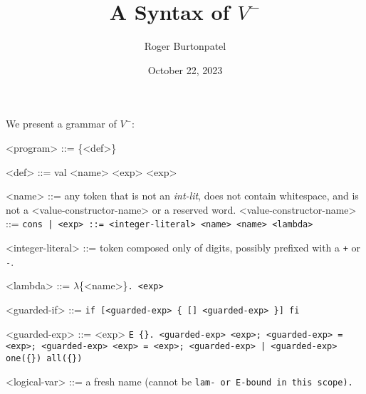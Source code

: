 \documentclass[]{article}
\title{A Syntax of $V^{-}$}
\author{Roger Burtonpatel}
\date{October 22, 2023}
\begin{document}
\maketitle

We present a grammar of $V^{-}$: 

\bigskip



\begin{grammar}
    <program> ::= \{<def>\}
    
    <def> ::= val <name> <exp>
        \alt <exp>
    
    <name> ::= any token that is not an \textit{int-lit}, does not contain 
    whitespace,
    and is not a <value-constructor-name> or a reserved word.
    <value-constructor-name> ::= \tt{cons} | 
    <exp> ::= <integer-literal>
        \alt <name>
        \alt <name>
        \alt <lambda>

    <integer-literal> ::= token composed only of digits, possibly prefixed with a \texttt{+} or \texttt{-}.

    <lambda> ::= $\lambda$\{<name>\}\tt{.} <exp>

    <guarded-if> ::= \tt{if}  [<guarded-exp> \{ [] <guarded-exp> \}] \tt{fi}


    <guarded-exp> ::= <exp>
    \alt  \tt{E} \{<logical-var>\}\tt{.} <guarded-exp>
    \alt  <exp>\tt{;} <guarded-exp>
     \tt{=} <exp>\tt{;} <guarded-exp>
    \alt   <exp> \tt{=} <exp>\tt{;} <guarded-exp>
     | <guarded-exp>
    \alt   \tt{one}(\{<guarded-exp>\})
    \alt   \tt{all}(\{<guarded-exp>\})

    <logical-var> ::= a fresh name (cannot be \tt{lam}- or \tt{E}-bound in
    this scope).

\end{grammar}
\end{document}
